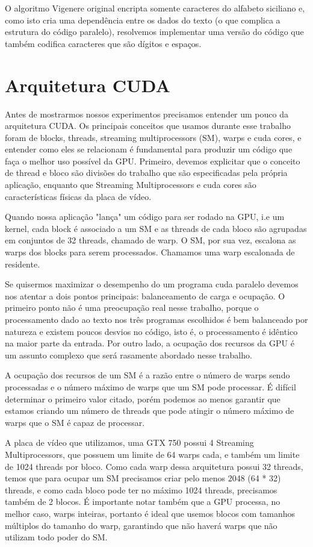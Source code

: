 \documentclass[12pt]{article}
\begin{document}
O algoritmo Vigenere original encripta somente caracteres do alfabeto
siciliano e, como isto cria uma dependência entre os dados do texto
(o que complica a estrutura do código paralelo), resolvemos implementar 
uma versão do código que também codifica caracteres que são dígitos 
e espaços.


\section{Arquitetura CUDA}
Antes de mostrarmos nossos experimentos precisamos entender um pouco da
arquitetura CUDA. Os principais conceitos que usamos durante esse 
trabalho foram de blocks, threads, streaming multiprocessors (SM), warps
e cuda cores, e entender como eles se relacionam é fundamental para
produzir um código que faça o melhor uso possível da GPU. Primeiro,
devemos explicitar que o conceito de thread e bloco são divisões do 
trabalho que são especificadas pela própria aplicação, enquanto que
Streaming Multiprocessors e cuda cores são características físicas da
placa de vídeo. 

Quando nossa aplicação "lança" um código para ser rodado na GPU, i.e um 
kernel, cada block é associado a um SM e as threads de cada bloco
são agrupadas em conjuntos de 32 threads, chamado de warp. O SM, por sua
vez, escalona as warps dos blocks para serem processados. Chamamos uma
warp escalonada de residente.

Se quisermos maximizar o desempenho do um programa cuda paralelo devemos
nos atentar a dois pontos principais: balanceamento de carga e 
ocupação. O primeiro ponto não é uma preocupação real nesse trabalho, 
porque o processamento dado ao texto nos três programas escolhidos é bem
balanceado por natureza e existem poucos desvios no código, isto é, 
o processamento é idêntico na maior parte da entrada. Por outro lado, a
ocupação dos recursos da GPU é um assunto complexo que será rasamente
abordado nesse trabalho.

A ocupação dos recursos de um SM é a razão entre o número de warps sendo
processadas e o número máximo de warps que um SM pode processar. É 
difícil determinar o primeiro valor citado, porém podemos ao menos 
garantir que estamos criando um número de threads que pode atingir o 
número máximo de warps que o SM é capaz de processar. 

A placa de vídeo que utilizamos, uma GTX 750 possui 4 Streaming 
Multiprocessors, que possuem um limite de 64 warps cada, e também um 
limite de 1024 threads por bloco. Como cada warp dessa arquitetura
possui 32 threads, temos que para ocupar um SM precisamos criar pelo
menos 2048 (64 * 32) threads, e como cada bloco pode ter no máximo 1024
threads, precisamos também de 2 blocos. É importante notar também que a
GPU processa, no melhor caso, warps inteiras, portanto é ideal que 
usemos blocos com tamanhos múltiplos do tamanho do warp, garantindo que 
não haverá warps que não utilizam todo poder do SM.
\end{document}
